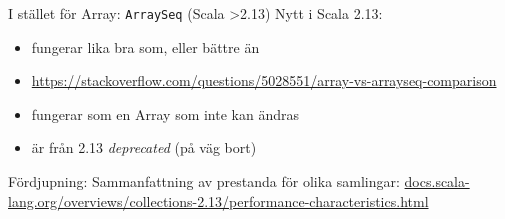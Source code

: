 \begin{Slide}{I stället för Array: \texttt{ArraySeq} (Scala >2.13)}
Nytt i Scala 2.13:
\begin{itemize}
  \item {} fungerar lika bra som, eller bättre än 
  \item \url{https://stackoverflow.com/questions/5028551/array-vs-arrayseq-comparison}
  \item {} fungerar som en Array som inte kan ändras
  \item {} är från 2.13 \textit{deprecated} (på väg bort)
\end{itemize}
{\SlideFontTiny Fördjupning: Sammanfattning av prestanda för olika samlingar: \href{https://docs.scala-lang.org/overviews/collections-2.13/performance-characteristics.html}{docs.scala-lang.org/overviews/collections-2.13/performance-characteristics.html}
}
\end{Slide}

